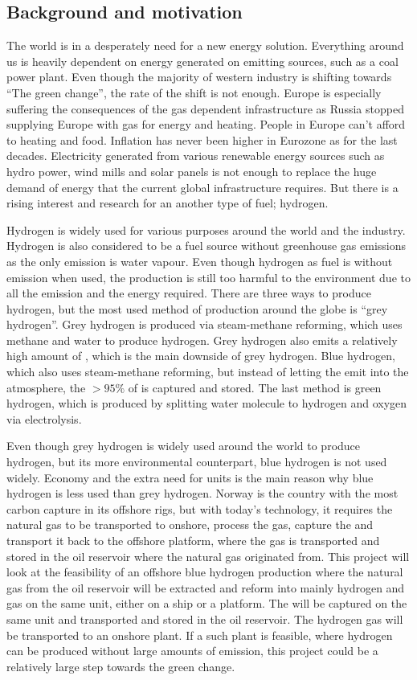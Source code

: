 \subsection{Background and motivation}
The world is in a desperately need for a new energy solution. Everything around us is heavily dependent on energy generated on  emitting sources, such as a coal power plant. Even though the majority of western industry is shifting towards ``The green change'', the rate of the shift is not enough. Europe is especially suffering the consequences of the gas dependent infrastructure as Russia stopped supplying Europe with gas for energy and heating. People in Europe can't afford to heating and food. Inflation has never been higher in Eurozone as for the last decades. Electricity generated from various renewable energy sources such as hydro power, wind mills and solar panels is not enough to replace the huge demand of energy that the current global infrastructure requires. But there is a rising interest and research for an another type of fuel; hydrogen.

Hydrogen is widely used for various purposes around the world and the industry. Hydrogen is also considered to be a fuel source without greenhouse gas emissions as the only emission is water vapour. Even though hydrogen as fuel is without emission when used, the production is still too harmful to the environment due to all the emission and the energy required. There are three ways to produce hydrogen, but the most used method of production around the globe is ``grey hydrogen''. Grey hydrogen is produced via steam-methane reforming, which uses methane and water to produce hydrogen. Grey hydrogen also emits a relatively high amount of , which is the main downside of grey hydrogen. Blue hydrogen, which also uses steam-methane reforming, but instead of letting the  emit into the atmosphere, the $>95\%$ of  is captured and stored. The last method is green hydrogen, which is produced by splitting water molecule to hydrogen and oxygen via electrolysis.

Even though grey hydrogen is widely used around the world to produce hydrogen, but its more environmental counterpart, blue hydrogen is not used widely. Economy and the extra need for units is the main reason why blue hydrogen is less used than grey hydrogen. Norway is the country with the most carbon capture in its offshore rigs, but with today's technology, it requires the natural gas to be transported to onshore, process the gas, capture the  and transport it back to the offshore platform, where the  gas is transported and stored in the oil reservoir where the natural gas originated from. This project will look at the feasibility of an offshore blue hydrogen production where the natural gas from the oil reservoir will be extracted and reform into mainly hydrogen and  gas on the same unit, either on a ship or a platform. The  will be captured on the same unit and transported and stored in the oil reservoir. The hydrogen gas will be transported to an onshore plant. If a such plant is feasible, where hydrogen can be produced without large amounts of emission, this project could be a relatively large step towards the green change. 

